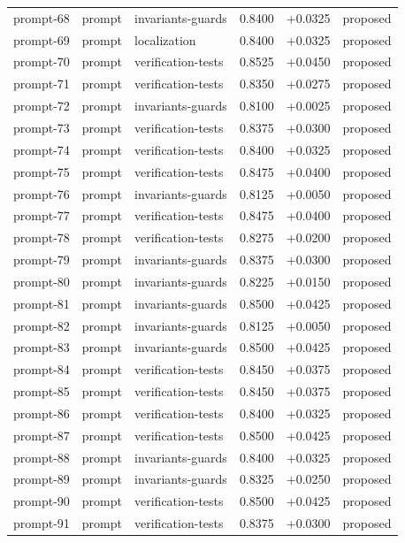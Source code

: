 \begin{center}
\begin{longtable}{llp{5.2cm}rrl}
prompt-68 & prompt & invariants-guards & 0.8400 & +0.0325 & proposed \\
prompt-69 & prompt & localization & 0.8400 & +0.0325 & proposed \\
prompt-70 & prompt & verification-tests & 0.8525 & +0.0450 & proposed \\
prompt-71 & prompt & verification-tests & 0.8350 & +0.0275 & proposed \\
prompt-72 & prompt & invariants-guards & 0.8100 & +0.0025 & proposed \\
prompt-73 & prompt & verification-tests & 0.8375 & +0.0300 & proposed \\
prompt-74 & prompt & verification-tests & 0.8400 & +0.0325 & proposed \\
prompt-75 & prompt & verification-tests & 0.8475 & +0.0400 & proposed \\
prompt-76 & prompt & invariants-guards & 0.8125 & +0.0050 & proposed \\
prompt-77 & prompt & verification-tests & 0.8475 & +0.0400 & proposed \\
prompt-78 & prompt & verification-tests & 0.8275 & +0.0200 & proposed \\
prompt-79 & prompt & invariants-guards & 0.8375 & +0.0300 & proposed \\
prompt-80 & prompt & invariants-guards & 0.8225 & +0.0150 & proposed \\
prompt-81 & prompt & invariants-guards & 0.8500 & +0.0425 & proposed \\
prompt-82 & prompt & invariants-guards & 0.8125 & +0.0050 & proposed \\
prompt-83 & prompt & invariants-guards & 0.8500 & +0.0425 & proposed \\
prompt-84 & prompt & verification-tests & 0.8450 & +0.0375 & proposed \\
prompt-85 & prompt & verification-tests & 0.8450 & +0.0375 & proposed \\
prompt-86 & prompt & verification-tests & 0.8400 & +0.0325 & proposed \\
prompt-87 & prompt & verification-tests & 0.8500 & +0.0425 & proposed \\
prompt-88 & prompt & invariants-guards & 0.8400 & +0.0325 & proposed \\
prompt-89 & prompt & invariants-guards & 0.8325 & +0.0250 & proposed \\
prompt-90 & prompt & verification-tests & 0.8500 & +0.0425 & proposed \\
prompt-91 & prompt & verification-tests & 0.8375 & +0.0300 & proposed \\

\end{longtable}
\end{center}
